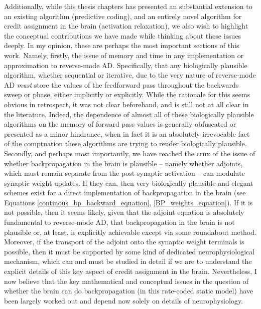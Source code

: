 Additionally, while this thesis chapters has presented an substantial extension to an existing algorithm (predictive coding), and an entirely novel algorithm for credit assignment in the brain (activation relaxation), we also wish to highlight the conceptual contributions we have made while thinking about these issues deeply. In my opinion, these are perhaps the most important sections of this work. Namely, firstly, the issue of memory and time in any implementation or approximation to reverse-mode AD. Specifically, that any biologically plausible algorithm, whether sequential or iterative, due to the very nature of reverse-mode AD \emph{must} store the values of the feedforward pass throughout the backwards sweep or phase, either implicitly or explicitly. While the rationale for this seems obvious in retrospect, it was not clear beforehand, and is still not at all clear in the literature. Indeed, the dependence of almost all of these biologically plausible algorithms on the memory of forward pass values is generally obfuscated or presented as a minor hindrance, when in fact it is an absolutely irrevocable fact of the comptuation these algorithms are trying to render biologically plausible. Secondly, and perhaps most importantly, we have reached the crux of the issue of whether backpropagation in the brain is plausible -- namely whether adjoints, which must remain separate from the post-synaptic activation -- can modulate synaptic weight updates. If they can, then very biologically plausible and elegant schemes exist for a direct implementation of backpropagation in the brain (see Equations \ref{continous_bp_backward_equation}, \ref{BP_weights_equation}). If it is not possible, then it seems likely, given that the adjoint equation is absolutely fundamental to reverse-mode AD, that backpropagation in the brain is not plausible or, at least, is explicitly achievable except via some roundabout method. Moreover, if the transport of the adjoint onto the synaptic weight terminals is possible, then it must be supported by some kind of dedicated neurophysiological mechanism, which can and must be studied in detail if we are to understand the explicit details of this key aspect of credit assignment in the brain. Nevertheless, I now believe that the key mathematical and conceptual issues in the question of whether the brain can do backpropagation (in this rate-coded static model) have been largely worked out and depend now solely on details of neurophysiology.

